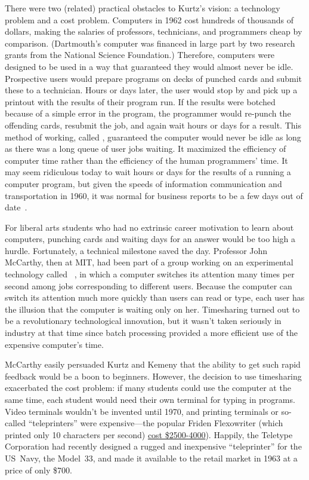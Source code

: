 There were two (related) practical obstacles to Kurtz's vision: a
technology problem and a cost problem.
Computers in 1962 cost hundreds of thousands of dollars, making
the salaries of professors,
technicians, and programmers cheap by comparison.
(Dartmouth's computer was financed in large part by two research
grants from the National Science Foundation.)
Therefore, computers were
designed to be used in a way that guaranteed they would almost never
be idle.
Prospective users would prepare programs on decks of punched cards and
submit these to a technician.
Hours or days later, the user
would stop by and pick up a printout with the results of their program run.
If the results were botched because of a simple error in
the program, the
programmer would re-punch the offending 
cards, resubmit the job, and again wait hours or days for a result.  This method
of working, called , 
guaranteed the computer would never be idle as
long as there was a long queue of user jobs waiting.  It
maximized  the efficiency of computer time rather than the
efficiency of the human programmers' time.
It may seem ridiculous today to wait hours or days for the results of a
running a computer program, but given the speeds of information
communication and 
transportation in 1960, it was  normal for business
reports to be a few days out of date~\cite{ceruzzi}.

\milestone
For liberal arts students who had no extrinsic career
motivation to learn about computers, punching cards and waiting days
for an answer would be too high a hurdle.
Fortunately, a technical milestone saved the day.
Professor John McCarthy, then at MIT, had been part of a group working
on an experimental 
technology called 
~\cite{corbato62timesharing}, in which a computer
switches its attention many times per second among jobs corresponding
to different users.  Because the computer can switch its attention much
more quickly than users can read or type, each user has the illusion
that the computer is waiting only on her.
Timesharing turned out to be a  revolutionary technological
innovation, but it wasn't taken
seriously in industry at that time since batch processing provided a
more efficient use of 
the expensive computer's time.

McCarthy easily persuaded Kurtz and Kemeny that the ability to get such
rapid feedback would be a boon to beginners.
However, the decision to use timesharing exacerbated the cost problem:
if many students could use the computer at the same time, each student
would need their own terminal for typing in programs.
Video terminals wouldn't be invented until 1970, and printing terminals
or so-called ``teleprinters'' were expensive---the popular
Friden Flexowriter (which printed only 10 characters per second)
\href{http://retrotechnology.com/herbs_stuff/flex_behr.html}{cost \$2500-4000}).
\technology
Happily, the Teletype Corporation had recently designed a rugged and
inexpensive ``teleprinter'' for the US~Navy, the Model~33, and made it
available to the retail market in 1963 at a price of only \$700.  

